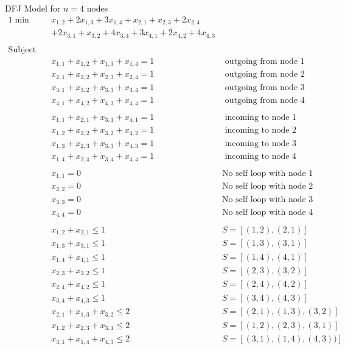 \documentclass[../open-optimization/open-optimization.tex]{subfiles}
\begin{document}
\begin{example}{DFJ Model for $n=4$ nodes}{}
\begin{align*}{1}\min\quad & x_{1,2} + 2 x_{1,3} + 3 x_{1,4} + x_{2,1} + x_{2,3} + 2 x_{2,4} \\& + 2 x_{3,1} + x_{3,2} + 4 x_{3,4} + 3 x_{4,1} + 2 x_{4,2} + 4 x_{4,3}\\
\\
\text{Subject to} \quad \\
 & x_{1,1} + x_{1,2} + x_{1,3} + x_{1,4} = 1& \text{ outgoing from node 1}\\
  & x_{2,1} + x_{2,2} + x_{2,3} + x_{2,4} = 1& \text{ outgoing from node 2}\\
 & x_{3,1} + x_{3,2} + x_{3,3} + x_{3,4} = 1& \text{ outgoing from node 3}\\
 & x_{4,1} + x_{4,2} + x_{4,3} + x_{4,4} = 1& \text{ outgoing from node 4}\\
 \\
  & x_{1,1} + x_{2,1} + x_{3,1} + x_{4,1} = 1& \text{ incoming to node 1}\\
 & x_{1,2} + x_{2,2} + x_{3,2} + x_{4,2} = 1& \text{ incoming to node 2}\\
 & x_{1,3} + x_{2,3} + x_{3,3} + x_{4,3} = 1& \text{ incoming to node 3}\\ 
 & x_{1,4} + x_{2,4} + x_{3,4} + x_{4,4} = 1& \text{ incoming to node 4}\\
 \\
 & x_{1,1} = 0 & \text{No self loop with node 1}\\
 & x_{2,2} = 0& \text{No self loop with node 2}\\
 & x_{3,3} = 0& \text{No self loop with node 3}\\
 & x_{4,4} = 0& \text{No self loop with node 4}\\
 \\
 & x_{1,2} + x_{2,1} \leq 1& S = [(1,2), (2,1)]\\
 & x_{1,3} + x_{3,1} \leq 1& S = [(1,3), (3,1)]\\
 & x_{1,4} + x_{4,1} \leq 1& S = [(1,4), (4,1)]\\
 & x_{2,3} + x_{3,2} \leq 1& S = [(2,3), (3,2)]\\
 & x_{2,4} + x_{4,2} \leq 1& S = [(2,4), (4,2)]\\
 & x_{3,4} + x_{4,3} \leq 1& S = [(3,4), (4,3)]\\
 & x_{2,1} + x_{1,3} + x_{3,2} \leq 2 & S = [(2,1), (1,3), (3,2)]\\
 & x_{1,2} + x_{2,3} + x_{3,1} \leq 2& S = [(1,2), (2,3), (3,1)]\\
 & x_{3,1} + x_{1,4} + x_{4,3} \leq 2& S = [(3,1), (1,4), (4,3))]\\

\end{align*}
\end{example}
\end{document}
